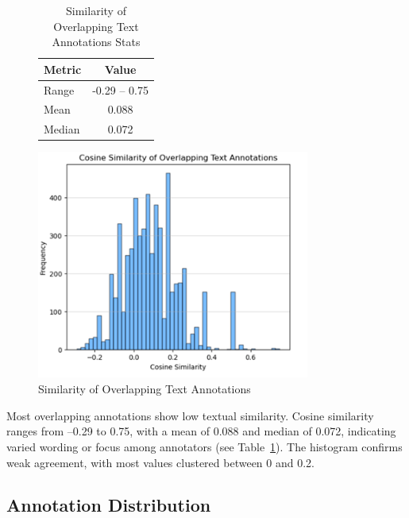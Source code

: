 \documentclass{article}
\begin{document}
\begin{figure}[H]
  \centering
  \begin{minipage}{0.4\textwidth}
    \centering
    \begin{table}[H]
      \caption{Similarity of Overlapping Text Annotations Stats}
      \label{tab:text_similarity}
      \begin{tabular}{lc}
        \toprule
        Metric & Value \\
        \midrule
        Range & -0.29 -- 0.75 \\
        Mean & 0.088 \\
        Median & 0.072 \\
        \bottomrule
      \end{tabular}
    \end{table}
  \end{minipage} \hfill
  \begin{minipage}{0.4\textwidth}
    \centering
    \includegraphics[width=0.8\textwidth]{figures/annotation_quality/similarity_of_overlapping_text_annotations.png}
    \caption{Similarity of Overlapping Text Annotations}
    \label{fig:text_similarity}
  \end{minipage}
\end{figure}

Most overlapping annotations show low textual similarity. Cosine similarity ranges from –0.29 to 0.75, with a mean of 0.088 and median of 0.072, indicating varied wording or focus among annotators (see Table~\ref{tab:text_similarity}). The histogram confirms weak agreement, with most values clustered between 0 and 0.2.

\subsection{Annotation Distribution}
\end{document}
